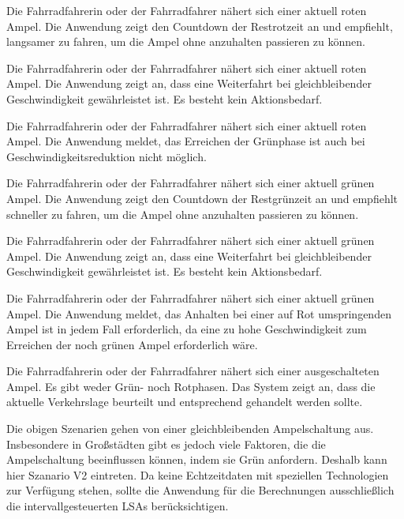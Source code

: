 \begin{description}[leftmargin=0.7cm,style=nextline]
\clearpage
\item[Szenario R1:] 
Die Fahrradfahrerin oder der Fahrradfahrer nähert sich einer aktuell roten Ampel. Die Anwendung zeigt den Countdown der Restrotzeit an und empfiehlt, langsamer zu fahren, um die Ampel ohne anzuhalten passieren zu können.  \\
\item[Szenario R2:] 
Die Fahrradfahrerin oder der Fahrradfahrer nähert sich einer aktuell roten Ampel. Die Anwendung zeigt an, dass eine Weiterfahrt bei gleichbleibender Geschwindigkeit gewährleistet ist. Es besteht kein Aktionsbedarf. \\
\item[Szenario R3:] 
Die Fahrradfahrerin oder der Fahrradfahrer nähert sich einer aktuell roten Ampel. Die Anwendung meldet, das Erreichen der Grünphase ist auch bei Geschwindigkeitsreduktion nicht möglich.\\%
\item[Szenario G1:] 
Die Fahrradfahrerin oder der Fahrradfahrer nähert sich einer aktuell grünen Ampel. Die Anwendung zeigt den Countdown der Restgrünzeit an und empfiehlt schneller zu fahren, um die Ampel ohne anzuhalten passieren zu können.\\
\item[Szenario G2:] 
Die Fahrradfahrerin oder der Fahrradfahrer nähert sich einer aktuell grünen Ampel. Die Anwendung zeigt an, dass eine Weiterfahrt bei gleichbleibender Geschwindigkeit gewährleistet ist. Es besteht kein Aktionsbedarf.\\ 
\item[Szenario G3:] 
Die Fahrradfahrerin oder der Fahrradfahrer nähert sich einer aktuell grünen Ampel. Die Anwendung meldet, das Anhalten bei einer auf Rot umspringenden Ampel ist in jedem Fall erforderlich, da eine zu hohe Geschwindigkeit zum Erreichen der noch grünen Ampel erforderlich wäre.\\
\item[Szenario V1:] 
Die Fahrradfahrerin oder der Fahrradfahrer nähert sich einer ausgeschalteten Ampel. Es gibt weder Grün- noch Rotphasen. Das System zeigt an, dass die aktuelle Verkehrslage beurteilt und entsprechend gehandelt werden sollte.\\ 
\end{description}
\clearpage
\centerline{\grayRule}
Die obigen Szenarien gehen von einer gleichbleibenden Ampelschaltung aus. Insbesondere in Großstädten gibt es jedoch viele Faktoren, die die Ampelschaltung beeinflussen können, indem sie Grün anfordern. Deshalb kann hier Szanario V2 eintreten. Da keine Echtzeitdaten mit speziellen Technologien zur Verfügung stehen, sollte die Anwendung für die Berechnungen ausschließlich die intervallgesteuerten \glspl{LSA} berücksichtigen.\\
